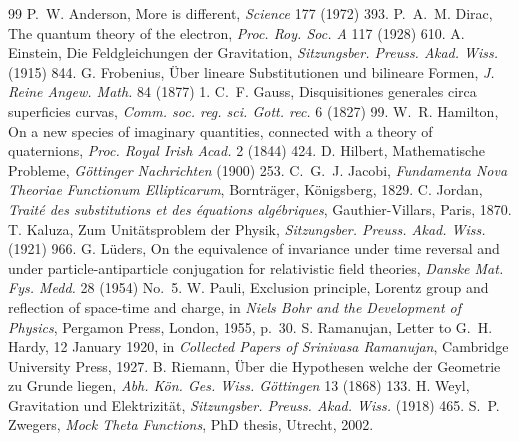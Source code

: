 \documentclass[11pt,a4paper]{article}
\theoremstyle{plain}
\theoremstyle{definition}
\theoremstyle{remark}
\begin{document}
\begin{thebibliography}{99}
 P.~W. Anderson, More is different, \emph{Science} 177 (1972) 393.
 P.~A.~M. Dirac, The quantum theory of the electron, \emph{Proc. Roy. Soc. A} 117 (1928) 610.
 A. Einstein, Die Feldgleichungen der Gravitation, \emph{Sitzungsber. Preuss. Akad. Wiss.} (1915) 844.
 G. Frobenius, \"Uber lineare Substitutionen und bilineare Formen, \emph{J. Reine Angew. Math.} 84 (1877) 1.
 C.~F. Gauss, Disquisitiones generales circa superficies curvas, \emph{Comm. soc. reg. sci. Gott. rec.} 6 (1827) 99.
 W.~R. Hamilton, On a new species of imaginary quantities, connected with a theory of quaternions, \emph{Proc. Royal Irish Acad.} 2 (1844) 424.
 D. Hilbert, Mathematische Probleme, \emph{G\"ottinger Nachrichten} (1900) 253.
 C.~G.~J. Jacobi, \emph{Fundamenta Nova Theoriae Functionum Ellipticarum}, Borntr\"ager, K\"onigsberg, 1829.
 C. Jordan, \emph{Trait\'e des substitutions et des \'equations alg\'ebriques}, Gauthier-Villars, Paris, 1870.
 T. Kaluza, Zum Unit\"atsproblem der Physik, \emph{Sitzungsber. Preuss. Akad. Wiss.} (1921) 966.
 G. L\"uders, On the equivalence of invariance under time reversal and under particle-antiparticle conjugation for relativistic field theories, \emph{Danske Mat. Fys. Medd.} 28 (1954) No.~5.
 W. Pauli, Exclusion principle, Lorentz group and reflection of space-time and charge, in \emph{Niels Bohr and the Development of Physics}, Pergamon Press, London, 1955, p.~30.
 S. Ramanujan, Letter to G.~H. Hardy, 12 January 1920, in \emph{Collected Papers of Srinivasa Ramanujan}, Cambridge University Press, 1927.
 B. Riemann, \"Uber die Hypothesen welche der Geometrie zu Grunde liegen, \emph{Abh. K\"on. Ges. Wiss. G\"ottingen} 13 (1868) 133.
 H. Weyl, Gravitation und Elektrizit\"at, \emph{Sitzungsber. Preuss. Akad. Wiss.} (1918) 465.
 S.~P. Zwegers, \emph{Mock Theta Functions}, PhD thesis, Utrecht, 2002.
\end{thebibliography}
\end{document}
